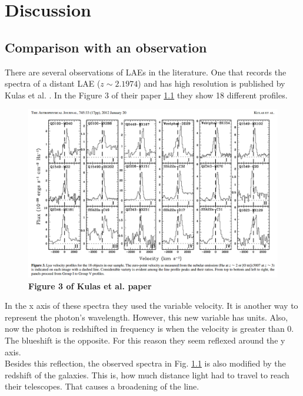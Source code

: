 \setcounter{equation}{0}
\chapter{Discussion}
\label{chap:discussion}

\section{Comparison with an observation}

There are several observations of LAEs in the literature. One that records the spectra of a distant LAE ($z\sim2.1974$) and has high resolution is published by Kulas et al. \cite{Kulas12}. In the Figure 3 of their paper \ref{fig:kulas} they show 18 different \lya profiles. \\

\begin{figure}[h!]
	\begin{center}
		\includegraphics[width=1\textwidth]{./figures/chapter4/figure3}
	\end{center}
	\caption{\textbf{Figure 3 of Kulas et al. paper} \cite{Kulas12}
		\label{fig:kulas}}
\end{figure}

In the x axis of these spectra they used the variable velocity. It is another way to represent the photon's wavelength. However, this new variable has units. Also, now the photon is redshifted in frequency is when the velocity is greater than 0. The blueshift is the opposite. For this reason they seem reflexed around the y axis. \\

Besides this reflection, the observed spectra in Fig. \ref{fig:kulas} is also modified by the redshift of the galaxies. This is, how much distance light had to travel to reach their telescopes. That causes a broadening of the line. \\

